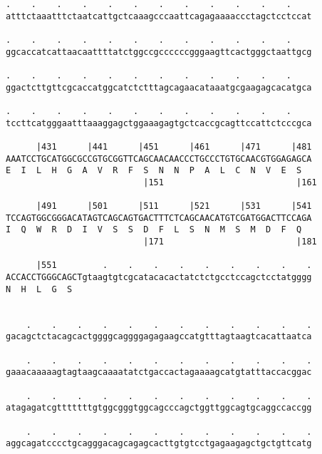 \documentclass{article}
\begin{document}
\begin{Verbatim}
.    .    .    .    .    .    .    .    .    .    .    .    
atttctaaatttctaatcattgctcaaagcccaattcagagaaaaccctagctcctccat
                                                            
.    .    .    .    .    .    .    .    .    .    .    .    
ggcaccatcattaacaattttatctggccgccccccgggaagttcactgggctaattgcg
                                                            
.    .    .    .    .    .    .    .    .    .    .    .    
ggactcttgttcgcaccatggcatctctttagcagaacataaatgcgaagagcacatgca
                                                            
.    .    .    .    .    .    .    .    .    .    .    .    
tccttcatgggaatttaaaggagctggaaagagtgctcaccgcagttccattctcccgca
                                                            
      |431      |441      |451      |461      |471      |481
AAATCCTGCATGGCGCCGTGCGGTTCAGCAACAACCCTGCCCTGTGCAACGTGGAGAGCA
E  I  L  H  G  A  V  R  F  S  N  N  P  A  L  C  N  V  E  S  
                           |151                          |161
  
      |491      |501      |511      |521      |531      |541
TCCAGTGGCGGGACATAGTCAGCAGTGACTTTCTCAGCAACATGTCGATGGACTTCCAGA
I  Q  W  R  D  I  V  S  S  D  F  L  S  N  M  S  M  D  F  Q  
                           |171                          |181
  
      |551         .    .    .    .    .    .    .    .    .
ACCACCTGGGCAGCTgtaagtgtcgcatacacactatctctgcctccagctcctatgggg
N  H  L  G  S                                               
                                                            
  
    .    .    .    .    .    .    .    .    .    .    .    .
gacagctctacagcactggggcaggggagagaagccatgtttagtaagtcacattaatca
                                                            
    .    .    .    .    .    .    .    .    .    .    .    .
gaaacaaaaagtagtaagcaaaatatctgaccactagaaaagcatgtatttaccacggac
                                                            
    .    .    .    .    .    .    .    .    .    .    .    .
atagagatcgtttttttgtggcgggtggcagcccagctggttggcagtgcaggccaccgg
                                                            
    .    .    .    .    .    .    .    .    .    .    .    .
aggcagatcccctgcagggacagcagagcacttgtgtcctgagaagagctgctgttcatg
                                                            

\end{Verbatim}
\end{document}
